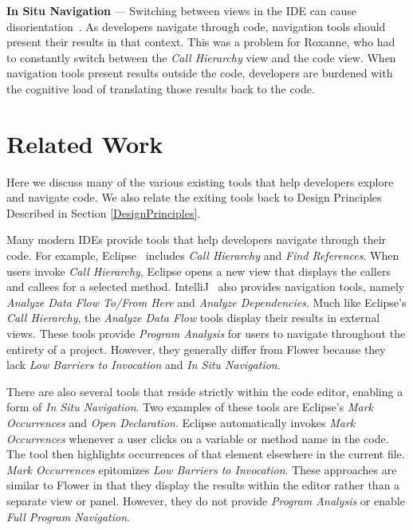 \documentclass[conference]{IEEEtran}
\begin{document}
\vspace{1em} 
\noindent\textbf{In Situ Navigation}  ---
Switching between views in the IDE can cause disorientation~\cite{deAlwis2006disorient}. 
As developers navigate through code, navigation tools should present their results in that context. 
This was a problem for Roxanne, who had to constantly switch between the \emph{Call Hierarchy} view and the code view.
When navigation tools present results outside the code, developers are burdened with the cognitive load of translating those results back to the code.

\section{Related Work}
Here we discuss many of the various existing tools that help developers explore and navigate code. We also relate the exiting tools back to Design Principles Described in Section \ref{DesignPrinciples}.

Many modern IDEs provide tools that help developers navigate through their code. 
For example, Eclipse~\cite{Eclipse} includes \emph{Call Hierarchy} and \emph{Find References}. 
When users invoke \emph{Call Hierarchy}, Eclipse opens a new view that displays the callers and callees for a selected method.  
IntelliJ~\cite{IntelliJ} also provides navigation tools, namely \emph{Analyze Data Flow To/From Here} and \emph{Analyze Dependencies}.
Much like Eclipse's \emph{Call Hierarchy}, the \emph{Analyze Data Flow} tools display their results in external views. 
These tools provide \textit{Program Analysis} for users to navigate throughout the entirety of a project. 
However, they generally differ from Flower because they lack \textit{Low Barriers to Invocation} and \textit{In Situ Navigation}.

There are also several tools that reside strictly within the code editor, enabling a form of \textit{In Situ Navigation}.
Two examples of these tools are Eclipse's \emph{Mark Occurrences} and \emph{Open Declaration}. 
Eclipse automatically invokes \emph{Mark Occurrences} whenever a user clicks on a variable or method name in the code.
The tool then highlights occurrences of that element elsewhere in the current file.
\emph{Mark Occurrences} epitomizes \textit{Low Barriers to Invocation}.
These approaches are similar to Flower  in that they display the results within the editor rather than a separate view or panel.
However, they do not provide \textit{Program Analysis} or enable \textit{Full Program Navigation}.
\end{document}

